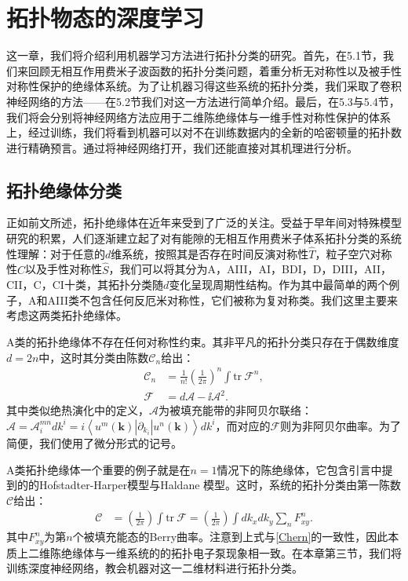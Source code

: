 \chapter{拓扑物态的深度学习}\label{sec:topoml}

这一章，我们将介绍利用机器学习方法进行拓扑分类的研究。首先，在5.1节，我们来回顾无相互作用费米子波函数的拓扑分类问题，着重分析无对称性以及被手性对称性保护的绝缘体系统。为了让机器习得这些系统的拓扑分类，我们采取了卷积神经网络的方法——在5.2节我们对这一方法进行简单介绍。最后，在5.3与5.4节，我们将会分别将神经网络方法应用于二维陈绝缘体与一维手性对称性保护的体系上，经过训练，我们将看到机器可以对不在训练数据内的全新的哈密顿量的拓扑数进行精确预言。通过将神经网络打开，我们还能直接对其机理进行分析。


\section{拓扑绝缘体分类}
正如前文所述，拓扑绝缘体在近年来受到了广泛的关注。受益于早年间对特殊模型研究的积累，人们逐渐建立起了对有能隙的无相互作用费米子体系拓扑分类\cite{topoclassify2016}的系统性理解：对于任意的$d$维系统，按照其是否存在时间反演对称性$\hat{T}$，粒子空穴对称性$\hat{C}$以及手性对称性$\hat{S}$，我们可以将其分为A，AIII，AI，BDI，D，DIII，AII，CII，C，CI十类，其拓扑分类随$d$变化呈现周期性结构。作为其中最简单的两个例子，A和AIII类不包含任何反厄米对称性，它们被称为复对称类。我们这里主要来考虑这两类拓扑绝缘体。

A类的拓扑绝缘体不存在任何对称性约束。其非平凡的拓扑分类只存在于偶数维度$d=2n$中，这时其分类由陈数$\mathcal{C}_n$给出：
\begin{align}
\mathcal{C}_n&=\frac{1}{n!}\left(\frac{1}{2\pi}\right)^n\int \text{tr}\ \mathcal{F}^n,\\
\mathcal{F}&=d\mathcal{A}-\ii \mathcal{A}^2.
\end{align}
其中类似绝热演化中的定义，$\mathcal{A}$为被填充能带的非阿贝尔联络：
$\mathcal{A}=\mathcal{A}_i^{m n}dk^i=i\left<u^m(\mathbf{k})|\partial_{k_i}|u^n(\mathbf{k})\right>dk^i$，而对应的$\mathcal{F}$则为非阿贝尔曲率。为了简便，我们使用了微分形式的记号。

A类拓扑绝缘体一个重要的例子就是在$n=1$情况下的陈绝缘体，它包含引言中提到的的Hofstadter-Harper模型与Haldane 模型。这时，系统的拓扑分类由第一陈数$\mathcal{C}$给出：
\begin{align}
\mathcal{C}&=\left(\frac{1}{2\pi}\right)\int \text{tr}\ \mathcal{F}=\left(\frac{1}{2\pi}\right)\int dk_x dk_y \sum_n F_{xy}^n.
\end{align}
其中$F^n_{xy}$为第$n$个被填充能态的Berry曲率。注意到上式与\eqref{Chern}的一致性，因此本质上二维陈绝缘体与一维系统的的拓扑电子泵现象相一致。在本章第三节，我们将训练深度神经网络，教会机器对这一二维材料进行拓扑分类。

